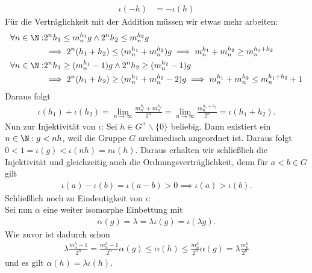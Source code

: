 \begin{solution}
\begin{align*}
  \iota(-h) &= -\iota(h)
\end{align*}
Für die Verträglichkeit mit der Addition müssen wir etwas mehr arbeiten:
\begin{align*}
  \forall n \in \N:& 2^nh_1 \leq m_n^{h_1}g \land 2^nh_2 \leq m_n^{h_2}g \\
  &\implies 2^n(h_1 + h_2) \leq (m_n^{h_1} + m_n^{h_2})g \implies m_n^{h_1} + m_n^{h_2} \geq m_n^{h_1 + h_2} \\
  \forall n \in \N:& 2^nh_1 \geq (m_n^{h_1}-1)g \land 2^nh_2 \geq (m_n^{h_2}-1)g \\
  &\implies 2^n(h_1 + h_2) \geq (m_n^{h_1} + m_n^{h_2} - 2)g \implies m_n^{h_1} + m_n^{h_2} \leq m_n^{h_1 + h_2} + 1
\end{align*}
Daraus folgt
\begin{align*}
  \iota(h_1) + \iota(h_2) = \lim_{n \rightarrow \infty} \frac{m_n^{h_1} + m_n^{h_2}}{2^n}
  = \lim_{n \rightarrow \infty} \frac{m_n^{h_1 + h_2}}{2^n} = \iota(h_1 + h_2).
\end{align*}
Nun zur Injektivität von $\iota$: Sei $h \in G^+\backslash\{0\}$ beliebig.
Dann existiert ein $n \in \N: g < nh$, weil die Gruppe $G$
archimedisch angeordnet ist. Daraus folgt $0 < 1 = \iota(g) < \iota(nh) = n\iota(h)$.
Daraus erhalten wir schließlich die Injektivität
und gleichzeitig auch die Ordnungsverträglichkeit, denn für $a < b \in G$ gilt
\begin{align*}
  \iota(a) - \iota(b) = \iota(a-b) > 0 \implies \iota(a) > \iota(b).
\end{align*}
Schließlich noch zu Eindeutigkeit von $\iota$: \\
Sei nun $\alpha$ eine weiter isomorphe Einbettung mit
\begin{align*}
  \alpha(g) = \lambda = \lambda \iota(g) = \iota(\lambda g).
\end{align*}
Wie zuvor ist dadurch schon
\begin{align*}
  \lambda \frac{m_n^h - 1}{2^n} = \frac{m_n^h - 1}{2^n}\alpha(g) \leq \alpha(h) \leq \frac{m_n^h}{2^n}\alpha(g)
  = \lambda \frac{m_n^h}{2^n}
\end{align*}
und es gilt $\alpha(h) = \lambda \iota(h)$.
\end{solution}
